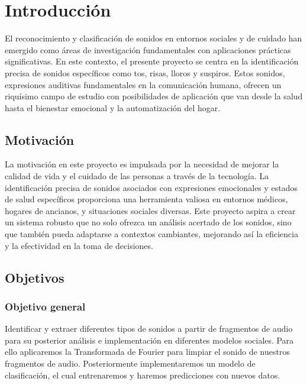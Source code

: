 
\section{Introducción}
El reconocimiento y clasificación de sonidos en entornos sociales y de cuidado han
emergido como áreas de investigación fundamentales con aplicaciones prácticas
significativas. En este contexto, el presente proyecto se centra en la identificación
precisa de sonidos específicos como tos, risas, lloros y suspiros. Estos sonidos,
expresiones auditivas fundamentales en la comunicación humana, ofrecen un
riquísimo campo de estudio con posibilidades de aplicación que van desde la salud
hasta el bienestar emocional y la automatización del hogar.
\subsection{Motivación}
La motivación en este proyecto es impulsada por la necesidad de mejorar la calidad
de vida y el cuidado de las personas a través de la tecnología. La identificación
precisa de sonidos asociados con expresiones emocionales y estados de salud
específicos proporciona una herramienta valiosa en entornos médicos, hogares de
ancianos, y situaciones sociales diversas. Este proyecto aspira a crear un sistema
robusto que no solo ofrezca un análisis acertado de los sonidos, sino que también
pueda adaptarse a contextos cambiantes, mejorando así la eficiencia y la efectividad
en la toma de decisiones. 
\subsection{Objetivos}
\subsubsection{Objetivo general}
Identificar y extraer diferentes tipos de sonidos a partir de fragmentos de audio para su posterior análisis e implementación en diferentes modelos sociales. Para ello aplicaremos la Transformada de Fourier para limpiar el sonido de nuestros fragmentos de audio. Posteriormente implementaremos un modelo de clasificación, el cual entrenaremos y haremos predicciones con nuevos datos.
